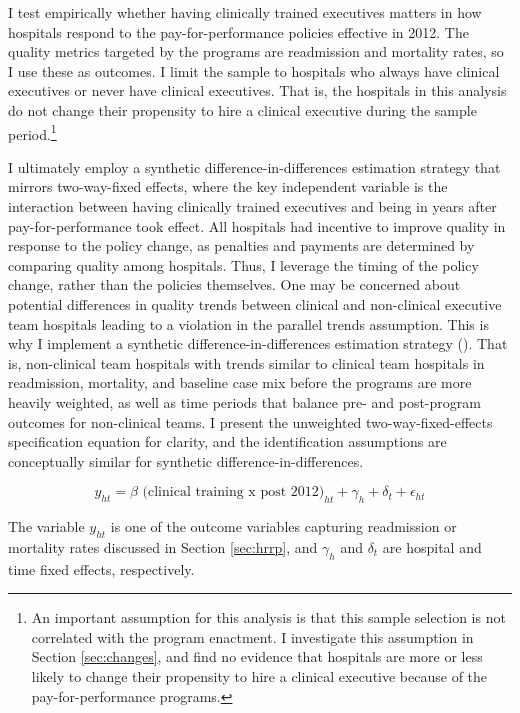 \documentclass[12pt]{article}
\begin{document}
    I test empirically whether having clinically trained executives matters in how hospitals respond to the pay-for-performance policies effective in 2012. The quality metrics targeted by the programs are readmission and mortality rates, so I use these as outcomes. I limit the sample to hospitals who always have clinical executives or never have clinical executives. That is, the hospitals in this analysis do not change their propensity to hire a clinical executive during the sample period.\footnote{An important assumption for this analysis is that this sample selection is not correlated with the program enactment. I investigate this assumption in Section \ref{sec:changes}, and find no evidence that hospitals are more or less likely to change their propensity to hire a clinical executive because of the pay-for-performance programs. }
    
    I ultimately employ a synthetic difference-in-differences estimation strategy that mirrors two-way-fixed effects, where the key independent variable is the interaction between having clinically trained executives and being in years after pay-for-performance took effect. All hospitals had incentive to improve quality in response to the policy change, as penalties and payments are determined by comparing quality among hospitals. Thus, I leverage the timing of the policy change, rather than the policies themselves. One may be concerned about potential differences in quality trends between clinical and non-clinical executive team hospitals leading to a violation in the parallel trends assumption. This is why I implement a synthetic difference-in-differences estimation strategy (\cite{arkhangelsky2021synthetic}). That is, non-clinical team hospitals with trends similar to clinical team hospitals in readmission, mortality, and baseline case mix before the programs are more heavily weighted, as well as time periods that balance pre- and post-program outcomes for non-clinical teams. I present the unweighted two-way-fixed-effects specification equation for clarity, and the identification assumptions are conceptually similar for synthetic difference-in-differences.

    \begin{equation}
    \label{eq:clinical}
    y_{ht} = \beta \text{ (clinical training x post 2012)}_{ht} + \gamma_{h} + \delta_t + \epsilon_{ht}
    \end{equation}
    

    \noindent The variable $y_{ht}$ is one of the outcome variables capturing readmission or mortality rates discussed in Section \ref{sec:hrrp}, and $\gamma_h$ and $\delta_t$ are hospital and time fixed effects, respectively. 
\end{document}
